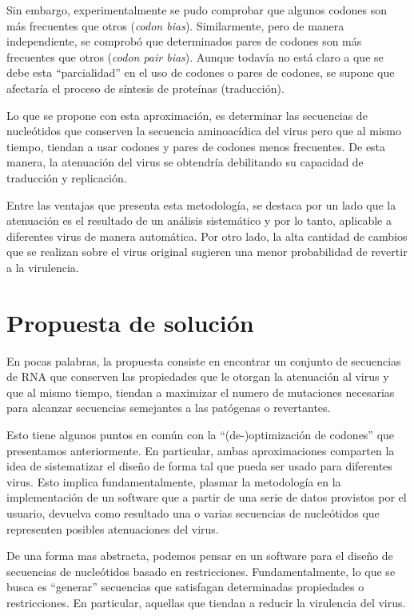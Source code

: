 Sin embargo, experimentalmente se pudo comprobar que algunos codones son m\'as
frecuentes que otros (\textit{codon bias}). Similarmente, pero de manera
independiente, se comprob\'o que determinados pares de codones son m\'as
frecuentes que otros (\textit{codon pair bias}). Aunque todav\'ia no est\'a
claro a que se debe esta ``parcialidad'' en el uso de codones o pares de
codones, se supone que afectar\'ia el proceso de s\'intesis de prote\'inas
(traducci\'on). 

Lo que se propone con esta aproximaci\'on, es determinar las secuencias de
nucle\'otidos que conserven la secuencia aminoac\'idica del virus pero que al
mismo tiempo, tiendan a usar codones y pares de codones menos frecuentes. De
esta manera, la atenuaci\'on del virus se obtendr\'ia debilitando su capacidad
de traducci\'on y replicaci\'on. 

Entre las ventajas que presenta esta metodolog\'ia, se destaca por un lado que
la atenuaci\'on es el resultado de un an\'alisis sistem\'atico y por lo tanto,
aplicable a diferentes virus de manera autom\'atica. Por otro lado, la alta
cantidad de cambios que se realizan sobre el virus original sugieren una menor
probabilidad de revertir a la virulencia.

\section{Propuesta de soluci\'on}
\label{vacunas-propuesta}

En pocas palabras, la propuesta consiste en encontrar un conjunto de secuencias
de \ac{RNA} que conserven las propiedades que le otorgan la atenuaci\'on al
virus y que al mismo tiempo, tiendan a maximizar el numero de mutaciones
necesarias para alcanzar secuencias semejantes a las pat\'ogenas o revertantes.

Esto tiene algunos puntos en com\'un con la ``(de-)optimizaci\'on de codones''
que presentamos anteriormente. En particular, ambas aproximaciones comparten la
idea de sistematizar el dise\~no de forma tal que pueda ser usado para
diferentes virus. Esto implica fundamentalmente, plasmar la metodolog\'ia en la
implementaci\'on de un software que a partir de una serie de datos provistos por
el usuario, devuelva como resultado una o varias secuencias de nucle\'otidos que
representen posibles atenuaciones del virus.

De una forma mas abstracta, podemos pensar en un software para el dise\~no de
secuencias de nucle\'otidos basado en restricciones. Fundamentalmente, lo que se
busca es ``generar'' secuencias que satisfagan determinadas propiedades o
restricciones. En particular, aquellas que tiendan a reducir la virulencia del
virus.

